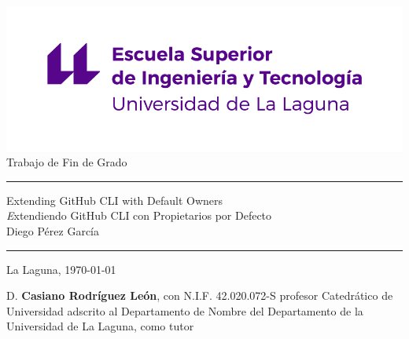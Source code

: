 \documentclass[spanish,a4paper,12pt,oneside]{extreport}
\begin{document}
\renewcommand\listtablename{Índice de Tablas}
\renewcommand\listfigurename{Índice de Figuras}

\pagestyle{empty}
\thispagestyle{empty}


\newcommand{\HRule}{\rule{\linewidth}{1mm}}
\setlength{\parindent}{0mm}
\setlength{\parskip}{0mm}


\begin{center}
  \includegraphics[scale=0.8]{images/escuela-ingenieria-tecnologia-original}\\[10mm]
  {\Huge Trabajo de Fin de Grado}
\end{center}

\HRule
\begin{flushright}
  {\Huge Extending GitHub CLI with Default Owners} \\[2.5mm]
  {\Large \textit Extendiendo GitHub CLI con Propietarios por Defecto} \\[5mm]
  {\Large Diego Pérez García} \\[5mm]
\end{flushright}
\HRule

\begin{center}
  \Large La Laguna, \today
\end{center}

\setlength{\parindent}{5mm}

\newpage
\thispagestyle{empty}

D. {\bf Casiano Rodríguez León}, con N.I.F. 42.020.072-S  profesor Catedrático de Universidad adscrito al Departamento de Nombre del Departamento de la Universidad de La Laguna, como tutor
\end{document}

